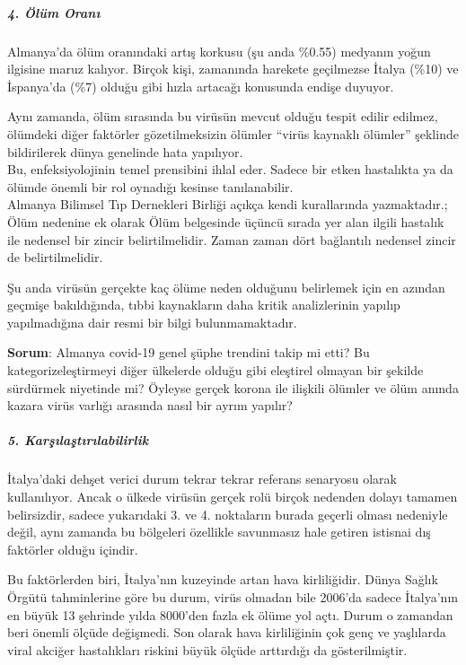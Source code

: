 \hypertarget{4-uxf6luxfcm-oranux131}{%
\subparagraph{\texorpdfstring{\textbf{4. Ölüm
Oranı}}{4. Ölüm Oranı}}\label{4-uxf6luxfcm-oranux131}}

Almanya'da ölüm oranındaki artış korkusu (şu anda \%0.55) medyanın yoğun
ilgisine maruz kalıyor. Birçok kişi, zamanında harekete geçilmezse
İtalya (\%10) ve İspanya'da (\%7) olduğu gibi hızla artacağı konusunda
endişe duyuyor.

Aynı zamanda, ölüm sırasında bu virüsün mevcut olduğu tespit edilir
edilmez, ölümdeki diğer faktörler gözetilmeksizin ölümler ``virüs
kaynaklı ölümler'' şeklinde bildirilerek dünya genelinde hata
yapılıyor.\\
Bu, enfeksiyolojinin temel prensibini ihlal eder. Sadece bir etken
hastalıkta ya da ölümde önemli bir rol oynadığı kesinse tanılanabilir.\\
Almanya Bilimsel Tıp Dernekleri Birliği açıkça kendi kurallarında
yazmaktadır.;\\
Ölüm nedenine ek olarak Ölüm belgesinde üçüncü sırada yer alan ilgili
hastalık ile nedensel bir zincir belirtilmelidir. Zaman zaman dört
bağlantılı nedensel zincir de belirtilmelidir.

Şu anda virüsün gerçekte kaç ölüme neden olduğunu belirlemek için en
azından geçmişe bakıldığında, tıbbi kaynakların daha kritik
analizlerinin yapılıp yapılmadığına dair resmi bir bilgi
bulunmamaktadır.

\textbf{Sorum}: Almanya covid-19 genel şüphe trendini takip mi etti? Bu
kategorizeleştirmeyi diğer ülkelerde olduğu gibi eleştirel olmayan bir
şekilde sürdürmek niyetinde mi? Öyleyse gerçek korona ile ilişkili
ölümler ve ölüm anında kazara virüs varlığı arasında nasıl bir ayrım
yapılır?

\hypertarget{5-karux15fux131laux15ftux131rux131labilirlik}{%
\subparagraph{\texorpdfstring{\textbf{5.
Karşılaştırılabilirlik}}{5. Karşılaştırılabilirlik}}\label{5-karux15fux131laux15ftux131rux131labilirlik}}

İtalya'daki dehşet verici durum tekrar tekrar referans senaryosu olarak
kullanılıyor. Ancak o ülkede virüsün gerçek rolü birçok nedenden dolayı
tamamen belirsizdir, sadece yukarıdaki 3. ve 4. noktaların burada
geçerli olması nedeniyle değil, aynı zamanda bu bölgeleri özellikle
savunmasız hale getiren istisnai dış faktörler olduğu içindir.

Bu faktörlerden biri, İtalya'nın kuzeyinde artan hava kirliliğidir.
Dünya Sağlık Örgütü tahminlerine göre bu durum, virüs olmadan bile
2006'da sadece İtalya'nın en büyük 13 şehrinde yılda 8000'den fazla ek
ölüme yol açtı. Durum o zamandan beri önemli ölçüde değişmedi. Son
olarak hava kirliliğinin çok genç ve yaşlılarda viral akciğer
hastalıkları riskini büyük ölçüde arttırdığı da gösterilmiştir.

